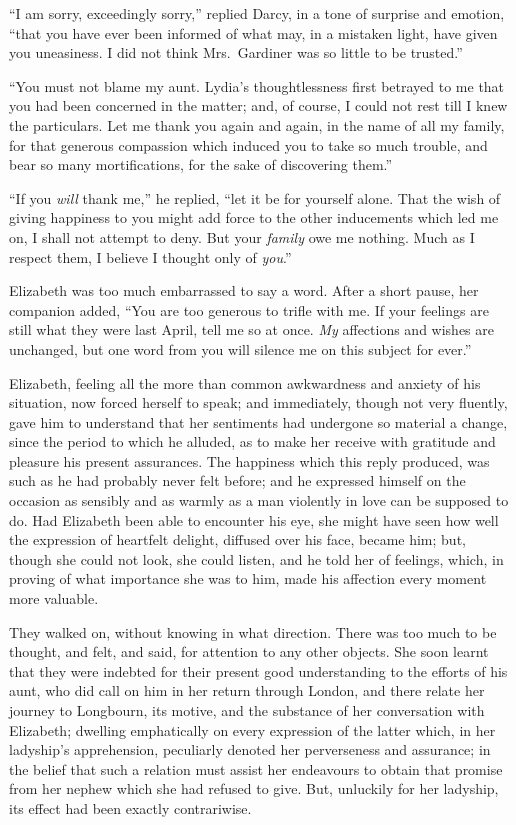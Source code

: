 \documentclass[12pt,english,oneside]{book}
\begin{document}
{}``I am sorry, exceedingly sorry,'' replied Darcy, in a tone of
surprise and emotion, {}``that you have ever been informed of what
may, in a mistaken light, have given you uneasiness. I did not think
Mrs.\ Gardiner was so little to be trusted.''

{}``You must not blame my aunt. Lydia's thoughtlessness first betrayed
to me that you had been concerned in the matter; and, of course, I
could not rest till I knew the particulars. Let me thank you again
and again, in the name of all my family, for that generous compassion
which induced you to take so much trouble, and bear so many mortifications,
for the sake of discovering them.''

{}``If you \textit{will} thank me,'' he replied, {}``let it be
for yourself alone. That the wish of giving happiness to you might
add force to the other inducements which led me on, I shall not attempt
to deny. But your \textit{family} owe me nothing. Much as I respect
them, I believe I thought only of \textit{you}.''

Elizabeth was too much embarrassed to say a word. After a short pause,
her companion added, {}``You are too generous to trifle with me.
If your feelings are still what they were last April, tell me so at
once. \textit{My} affections and wishes are unchanged, but one word
from you will silence me on this subject for ever.''

Elizabeth, feeling all the more than common awkwardness and anxiety
of his situation, now forced herself to speak; and immediately, though
not very fluently, gave him to understand that her sentiments had
undergone so material a change, since the period to which he alluded,
as to make her receive with gratitude and pleasure his present assurances.
The happiness which this reply produced, was such as he had probably
never felt before; and he expressed himself on the occasion as sensibly
and as warmly as a man violently in love can be supposed to do. Had
Elizabeth been able to encounter his eye, she might have seen how
well the expression of heartfelt delight, diffused over his face,
became him; but, though she could not look, she could listen, and
he told her of feelings, which, in proving of what importance she
was to him, made his affection every moment more valuable.

They walked on, without knowing in what direction. There was too much
to be thought, and felt, and said, for attention to any other objects.
She soon learnt that they were indebted for their present good understanding
to the efforts of his aunt, who did call on him in her return through
London, and there relate her journey to Longbourn, its motive, and
the substance of her conversation with Elizabeth; dwelling emphatically
on every expression of the latter which, in her ladyship's apprehension,
peculiarly denoted her perverseness and assurance; in the belief that
such a relation must assist her endeavours to obtain that promise
from her nephew which she had refused to give. But, unluckily for
her ladyship, its effect had been exactly contrariwise.
\end{document}

